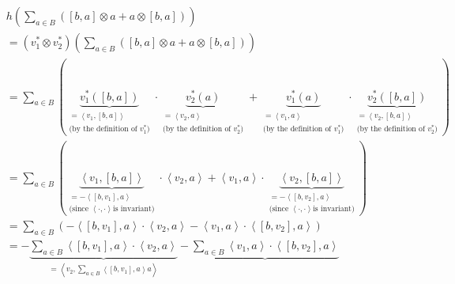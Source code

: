 \documentclass[etingof-lie.tex]{subfiles}
\begin{document}
\begin{align*}
&  h\left(  \sum\limits_{a\in B}\left(  \left[  b,a\right]  \otimes
a+a\otimes\left[  b,a\right]  \right)  \right) \\
&  =\left(  v_{1}^{\ast}\otimes v_{2}^{\ast}\right)  \left(  \sum\limits_{a\in
B}\left(  \left[  b,a\right]  \otimes a+a\otimes\left[  b,a\right]  \right)
\right) \\
&  =\sum\limits_{a\in B}\left(  \underbrace{v_{1}^{\ast}\left(  \left[
b,a\right]  \right)  }_{\substack{=\left\langle v_{1},\left[  b,a\right]
\right\rangle \\\text{(by the definition of }v_{1}^{\ast}\text{)}}%
}\cdot\underbrace{v_{2}^{\ast}\left(  a\right)  }_{\substack{=\left\langle
v_{2},a\right\rangle \\\text{(by the definition of }v_{2}^{\ast}\text{)}%
}}+\underbrace{v_{1}^{\ast}\left(  a\right)  }_{\substack{=\left\langle
v_{1},a\right\rangle \\\text{(by the definition of }v_{1}^{\ast}\text{)}%
}}\cdot\underbrace{v_{2}^{\ast}\left(  \left[  b,a\right]  \right)
}_{\substack{=\left\langle v_{2},\left[  b,a\right]  \right\rangle \\\text{(by
the definition of }v_{2}^{\ast}\text{)}}}\right) \\
&  =\sum\limits_{a\in B}\left(  \underbrace{\left\langle v_{1},\left[
b,a\right]  \right\rangle }_{\substack{=-\left\langle \left[  b,v_{1}\right]
,a\right\rangle \\\text{(since }\left\langle \cdot,\cdot\right\rangle \text{
is invariant)}}}\cdot\left\langle v_{2},a\right\rangle +\left\langle
v_{1},a\right\rangle \cdot\underbrace{\left\langle v_{2},\left[  b,a\right]
\right\rangle }_{\substack{=-\left\langle \left[  b,v_{2}\right]
,a\right\rangle \\\text{(since }\left\langle \cdot,\cdot\right\rangle \text{
is invariant)}}}\right) \\
&  =\sum\limits_{a\in B}\left(  -\left\langle \left[  b,v_{1}\right]
,a\right\rangle \cdot\left\langle v_{2},a\right\rangle -\left\langle
v_{1},a\right\rangle \cdot\left\langle \left[  b,v_{2}\right]  ,a\right\rangle
\right) \\
&  =-\underbrace{\sum\limits_{a\in B}\left\langle \left[  b,v_{1}\right]
,a\right\rangle \cdot\left\langle v_{2},a\right\rangle }_{=\left\langle
v_{2},\sum\limits_{a\in B}\left\langle \left[  b,v_{1}\right]  ,a\right\rangle
a\right\rangle }-\underbrace{\sum\limits_{a\in B}\left\langle v_{1}%
,a\right\rangle \cdot\left\langle \left[  b,v_{2}\right]  ,a\right\rangle
}
\end{align*}
\end{document}
